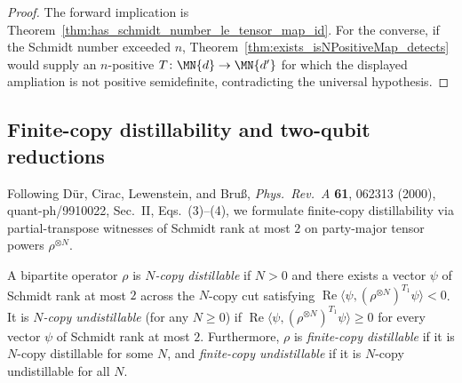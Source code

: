\begin{proof}
    \leanok
    The forward implication is
    Theorem~\ref{thm:has_schmidt_number_le_tensor_map_id}. For the converse, if the
    Schmidt number exceeded $n$, Theorem~\ref{thm:exists_isNPositiveMap_detects}
    would supply an $n$-positive $T\colon\MN{d}\to\MN{d'}$ for which the displayed
    ampliation is not positive semidefinite, contradicting the universal hypothesis.
\end{proof}

\subsection{Finite-copy distillability and two-qubit reductions}

Following Dür, Cirac, Lewenstein, and Bruß, \emph{Phys.\ Rev.\ A} \textbf{61}, 062313 (2000), quant-ph/9910022, Sec.\ II, Eqs.\ (3)--(4), we formulate finite-copy distillability via partial-transpose witnesses of Schmidt rank at most $2$ on party-major tensor powers $\rho^{\otimes N}$.

\begin{definition}
  \label{def:finite_copy_distillability}
  \leanok
  A bipartite operator $\rho$ is \emph{$N$-copy distillable} if $N > 0$ and there exists a vector $\psi$ of Schmidt rank at most $2$ across the $N$-copy cut satisfying $\operatorname{Re}\langle \psi, (\rho^{\otimes N})^{T_1} \psi \rangle < 0$. It is \emph{$N$-copy undistillable} (for any $N \ge 0$) if $\operatorname{Re}\langle \psi, (\rho^{\otimes N})^{T_1} \psi \rangle \ge 0$ for every vector $\psi$ of Schmidt rank at most $2$. Furthermore, $\rho$ is \emph{finite-copy distillable} if it is $N$-copy distillable for some $N$, and \emph{finite-copy undistillable} if it is $N$-copy undistillable for all $N$.
\end{definition}

